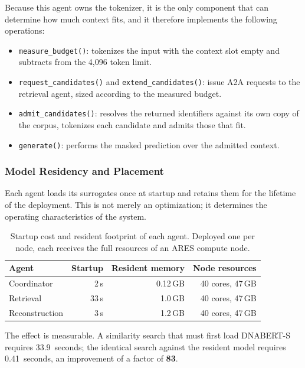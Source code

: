 Because this agent owns the tokenizer, it is the only component that can determine how much
context fits, and it therefore implements the following operations:

\begin{itemize}
    \item \texttt{measure\_budget()}: tokenizes the input with the context slot empty and
    subtracts from the 4{,}096 token limit.
    \item \texttt{request\_candidates()} and \texttt{extend\_candidates()}: issue A2A requests
    to the retrieval agent, sized according to the measured budget.
    \item \texttt{admit\_candidates()}: resolves the returned identifiers against its own copy
    of the corpus, tokenizes each candidate and admits those that fit.
    \item \texttt{generate()}: performs the masked prediction over the admitted context.
\end{itemize}

\subsubsection{Model Residency and Placement}

Each agent loads its surrogates once at startup and retains them for the lifetime of the
deployment. This is not merely an optimization; it determines the operating characteristics
of the system.

\begin{table}[H]
\centering
\begin{tabular}{lrrr}
\toprule
\textbf{Agent} & \textbf{Startup} & \textbf{Resident memory} & \textbf{Node resources} \\
\midrule
Coordinator    &  2\,s & 0.12\,GB & 40 cores, 47\,GB \\
Retrieval      & 33\,s & 1.0\,GB  & 40 cores, 47\,GB \\
Reconstruction &  3\,s & 1.2\,GB  & 40 cores, 47\,GB \\
\bottomrule
\end{tabular}
\caption{Startup cost and resident footprint of each agent. Deployed one per node, each
receives the full resources of an ARES compute node.}
\label{tab:residency}
\end{table}

The effect is measurable. A similarity search that must first load DNABERT-S requires
33.9~seconds; the identical search against the resident model requires 0.41~seconds, an
improvement of a factor of \textbf{83}.

